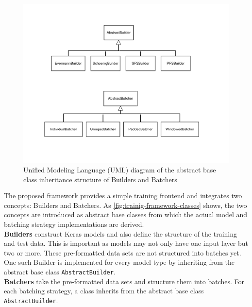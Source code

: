 \begin{figure}
    \centering
    \begin{adjustbox}{center}
    \includegraphics[width=1.25\textwidth]{gfx/training-framework-classes.pdf}
    \end{adjustbox}
    \caption[UML diagram of the framework classes]{Unified Modeling Language (UML) diagram of the abstract base class inheritance structure of Builders and Batchers}
    \label{fig:trainig-framework-classes}
\end{figure}

The proposed framework provides a simple training frontend and integrates two concepts: Builders and Batchers. As \autoref{fig:trainig-framework-classes} shows, the two concepts are introduced as abstract base classes from which the actual model and batching strategy implementations are derived.\\

\noindent\textbf{Builders} construct Keras models and also define the structure of the training and test data. This is important as models may not only have one input layer but two or more. These pre-formatted data sets are not structured into batches yet. One such Builder is implemented for every model type by inheriting from the abstract base class \verb=AbstractBuilder=.\\

\noindent\textbf{Batchers} take the pre-formatted data sets and structure them into batches. For each batching strategy, a class inherits from the abstract base class \verb=AbstractBuilder=.\\

